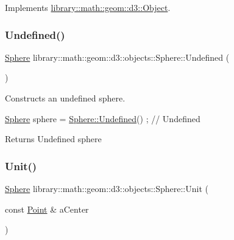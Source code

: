 Implements \hyperlink{classlibrary_1_1math_1_1geom_1_1d3_1_1_object_a989723a27a7d5f6739e45ea695a6c7ed}{library\+::math\+::geom\+::d3\+::\+Object}.

\mbox{\label{classlibrary_1_1math_1_1geom_1_1d3_1_1objects_1_1_sphere_a777600f8814a2879e925909f30cfe9c4}} 
\subsubsection{\texorpdfstring{Undefined()}{Undefined()}}
{\footnotesize\ttfamily \hyperlink{classlibrary_1_1math_1_1geom_1_1d3_1_1objects_1_1_sphere}{Sphere} library\+::math\+::geom\+::d3\+::objects\+::\+Sphere\+::\+Undefined (\begin{DoxyParamCaption}{ }\end{DoxyParamCaption})\hspace{0.3cm}{\ttfamily [static]}}



Constructs an undefined sphere. 


\begin{DoxyCode}
\hyperlink{classlibrary_1_1math_1_1geom_1_1d3_1_1objects_1_1_sphere_a55dccc8ea16ee55cd7694c26afa8ea39}{Sphere} sphere = \hyperlink{classlibrary_1_1math_1_1geom_1_1d3_1_1objects_1_1_sphere_a777600f8814a2879e925909f30cfe9c4}{Sphere::Undefined}() ; \textcolor{comment}{// Undefined}
\end{DoxyCode}


\begin{DoxyReturn}{Returns}
Undefined sphere 
\end{DoxyReturn}
\mbox{\label{classlibrary_1_1math_1_1geom_1_1d3_1_1objects_1_1_sphere_a5464ea9145425db63dedbd896d6c97b0}} 
\subsubsection{\texorpdfstring{Unit()}{Unit()}}
{\footnotesize\ttfamily \hyperlink{classlibrary_1_1math_1_1geom_1_1d3_1_1objects_1_1_sphere}{Sphere} library\+::math\+::geom\+::d3\+::objects\+::\+Sphere\+::\+Unit (\begin{DoxyParamCaption}\item[{const \hyperlink{classlibrary_1_1math_1_1geom_1_1d3_1_1objects_1_1_point}{Point} \&}]{a\+Center }\end{DoxyParamCaption})\hspace{0.3cm}{\ttfamily [static]}}



